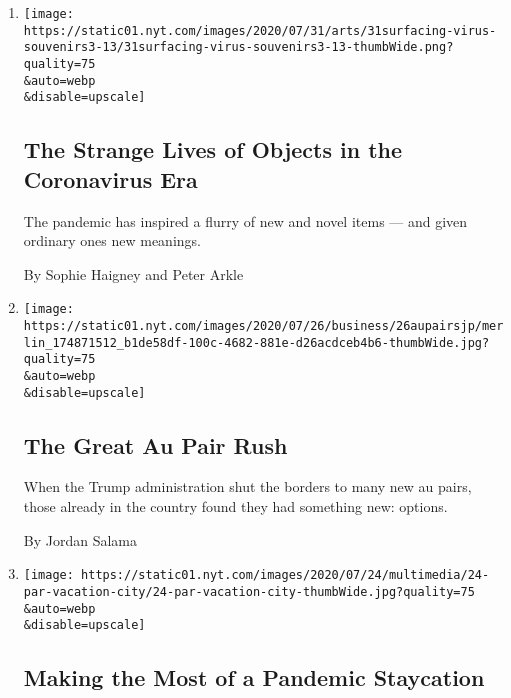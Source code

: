 \begin{enumerate}
\def\labelenumi{\arabic{enumi}.}
\item
  \href{/2020/08/01/arts/design/virus-design-objects.html}{}

  \texttt{[image: https://static01.nyt.com/images/2020/07/31/arts/31surfacing-virus-souvenirs3-13/31surfacing-virus-souvenirs3-13-thumbWide.png?quality=75\\\&auto=webp\\\&disable=upscale]}

  \hypertarget{the-strange-lives-of-objects-in-the-coronavirus-era}{%
  \subsection{The Strange Lives of Objects in the Coronavirus
  Era}\label{the-strange-lives-of-objects-in-the-coronavirus-era}}

  The pandemic has inspired a flurry of new and novel items --- and
  given ordinary ones new meanings.

  By Sophie Haigney and Peter Arkle
\item
  \href{/2020/07/25/business/the-great-au-pair-rush.html}{}

  \texttt{[image: https://static01.nyt.com/images/2020/07/26/business/26aupairsjp/merlin\_174871512\_b1de58df-100c-4682-881e-d26acdceb4b6-thumbWide.jpg?quality=75\\\&auto=webp\\\&disable=upscale]}

  \hypertarget{the-great-au-pair-rush}{%
  \subsection{The Great Au Pair Rush}\label{the-great-au-pair-rush}}

  When the Trump administration shut the borders to many new au pairs,
  those already in the country found they had something new: options.

  By Jordan Salama
\item
  \href{/2020/07/24/parenting/summer-staycation-coronavirus.html}{}

  \texttt{[image: https://static01.nyt.com/images/2020/07/24/multimedia/24-par-vacation-city/24-par-vacation-city-thumbWide.jpg?quality=75\\\&auto=webp\\\&disable=upscale]}

  \hypertarget{making-the-most-of-a-pandemic-staycation}{%
  \subsection{Making the Most of a Pandemic
  Staycation}\label{making-the-most-of-a-pandemic-staycation}}


\end{enumerate}
